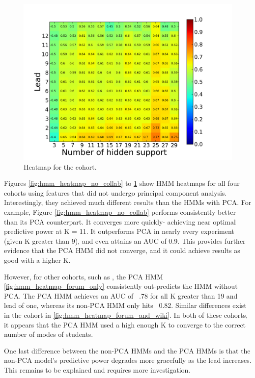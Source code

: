 \begin{figure}[ht!]
  \caption{Heatmap for the \wiki cohort.}\label{fig:hmm_heatmap_wiki_only}
  \centering
    \includegraphics[width=1.0\textwidth]{figures/hmm/wiki_only.png}
\end{figure}

Figures \ref{fig:hmm_heatmap_no_collab} to \ref{fig:hmm_heatmap_wiki_only} show HMM heatmaps for all four cohorts using features that did not undergo principal component analysis. Interestingly, they achieved much different results than the HMMs with PCA. For example, Figure \ref{fig:hmm_heatmap_no_collab} performs consistently better than its PCA counterpart. It converges more quickly- achieving near optimal predictive power at K = 11. It outperforms PCA in nearly every experiment (given K greater than 9), and even attains an AUC of 0.9. This provides further evidence that the PCA HMM did not converge, and it could achieve results as good with a higher K.

However, for other cohorts, such as \forum, the PCA HMM \ref{fig:hmm_heatmap_forum_only} consistently out-predicts the HMM without PCA. The PCA HMM achieves an AUC of ~.78 for all K greater than 19 and lead of one, whereas its non-PCA HMM only hits ~0.82. Similar differences exist in the \both cohort in \ref{fig:hmm_heatmap_forum_and_wiki}. In both of these cohorts, it appears that the PCA HMM used a high enough K to converge to the correct number of modes of students.

One last difference between the non-PCA HMMs and the PCA HMMs is that the non-PCA model's predictive power degrades more gracefully as the lead increases. This remains to be explained and requires more investigation.

